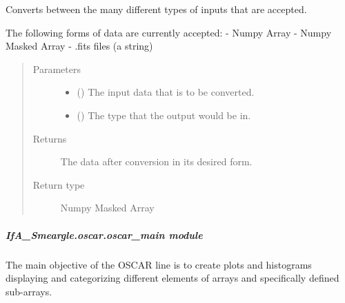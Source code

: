 \documentclass[letterpaper,10pt,english]{sphinxmanual}
\begin{document}
\begin{fulllineitems}
\label{\detokenize{python_docstrings/IfA_Smeargle.oscar.oscar_functions:IfA_Smeargle.oscar.oscar_functions.oscar_convert_data_inputs}}
Converts between the many different types of inputs that are accepted.

The following forms of data are currently accepted:
- Numpy Array
- Numpy Masked Array
- .fits files (a string)
\begin{quote}\begin{description}
\item[{Parameters}] \leavevmode\begin{itemize}
\item {} 
 () \textendash{} The input data that is to be converted.

\item {} 
 () \textendash{} The type that the output would be in.

\end{itemize}

\item[{Returns}] \leavevmode
{} \textendash{} The data after conversion in its desired form.

\item[{Return type}] \leavevmode
Numpy Masked Array

\end{description}\end{quote}

\end{fulllineitems}



\subparagraph{IfA\_Smeargle.oscar.oscar\_main module}
\label{\detokenize{python_docstrings/IfA_Smeargle.oscar.oscar_main:module-IfA_Smeargle.oscar.oscar_main}}\label{\detokenize{python_docstrings/IfA_Smeargle.oscar.oscar_main:ifa-smeargle-oscar-oscar-main-module}}\label{\detokenize{python_docstrings/IfA_Smeargle.oscar.oscar_main::doc}}
The main objective of the OSCAR line is to create plots and histograms displaying and
categorizing different elements of arrays and specifically defined sub-arrays.
\end{document}
